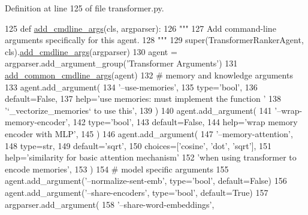 Definition at line 125 of file transformer.\+py.


\begin{DoxyCode}
125     \textcolor{keyword}{def }\hyperlink{namespaceparlai_1_1agents_1_1drqa_1_1config_a62fdd5554f1da6be0cba185271058320}{add\_cmdline\_args}(cls, argparser):
126         \textcolor{stringliteral}{"""}
127 \textcolor{stringliteral}{        Add command-line arguments specifically for this agent.}
128 \textcolor{stringliteral}{        """}
129         super(TransformerRankerAgent, cls).\hyperlink{namespaceparlai_1_1agents_1_1drqa_1_1config_a62fdd5554f1da6be0cba185271058320}{add\_cmdline\_args}(argparser)
130         agent = argparser.add\_argument\_group(\textcolor{stringliteral}{'Transformer Arguments'})
131         \hyperlink{namespaceparlai_1_1agents_1_1transformer_1_1transformer_a916bc49d43dc0e244d24c47956c621ca}{add\_common\_cmdline\_args}(agent)
132         \textcolor{comment}{# memory and knowledge arguments}
133         agent.add\_argument(
134             \textcolor{stringliteral}{'--use-memories'},
135             type=\textcolor{stringliteral}{'bool'},
136             default=\textcolor{keyword}{False},
137             help=\textcolor{stringliteral}{'use memories: must implement the function '}
138             \textcolor{stringliteral}{'`\_vectorize\_memories` to use this'},
139         )
140         agent.add\_argument(
141             \textcolor{stringliteral}{'--wrap-memory-encoder'},
142             type=\textcolor{stringliteral}{'bool'},
143             default=\textcolor{keyword}{False},
144             help=\textcolor{stringliteral}{'wrap memory encoder with MLP'},
145         )
146         agent.add\_argument(
147             \textcolor{stringliteral}{'--memory-attention'},
148             type=str,
149             default=\textcolor{stringliteral}{'sqrt'},
150             choices=[\textcolor{stringliteral}{'cosine'}, \textcolor{stringliteral}{'dot'}, \textcolor{stringliteral}{'sqrt'}],
151             help=\textcolor{stringliteral}{'similarity for basic attention mechanism'}
152             \textcolor{stringliteral}{'when using transformer to encode memories'},
153         )
154         \textcolor{comment}{# model specific arguments}
155         agent.add\_argument(\textcolor{stringliteral}{'--normalize-sent-emb'}, type=\textcolor{stringliteral}{'bool'}, default=\textcolor{keyword}{False})
156         agent.add\_argument(\textcolor{stringliteral}{'--share-encoders'}, type=\textcolor{stringliteral}{'bool'}, default=\textcolor{keyword}{True})
157         argparser.add\_argument(
158             \textcolor{stringliteral}{'--share-word-embeddings'},

\end{DoxyCode}

